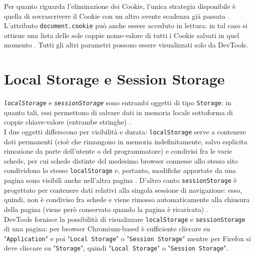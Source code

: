 \documentclass[a4paper, 12pt, twoside, openright]{book}
\begin{document}
Per quanto riguarda l'eliminazione dei Cookie, l'unica strategia disponibile è quella di sovrascrivere il Cookie con un altro avente scadenza già passata \cite{W3Schools:cookies}.\\
L'attributo \texttt{document.cookie} può anche essere acceduto in lettura: in tal caso si ottiene una lista delle sole coppie nome-valore di tutti i Cookie salvati in quel momento \cite{MDN_Web_docs:cookies}. Tutti gli altri parametri possono essere visualizzati solo da DevTools.

\section{Local Storage e Session Storage} %
\texttt{\textit{localStorage}} e \texttt{\textit{sessionStorage}} sono entrambi oggetti di tipo \texttt{Storage}: in quanto tali, essi permettono di salvare dati in memoria locale sottoforma di coppie chiave-valore (entrambe stringhe) \cite{MDN_Web_docs:storage_API}.\\
I due oggetti differscono per visibilità e durata: \texttt{localStorage} serve a contenere dati permanenti (cioè che rimangono in memoria indefinitamente, salvo esplicita rimozione da parte dell'utente o del programmatore) e condivisi fra le varie schede, per cui schede distinte del medesimo browser connesse allo stesso sito condividono lo stesso \texttt{localStorage} e, pertanto, modifiche apportate da una pagina sono visibili anche nell'altra pagina \cite{MDN_Web_docs:localStorage}. D'altro canto \texttt{sessionStorage} è progettato per contenere dati relativi alla singola sessione di navigazione: esso, quindi, non è condiviso fra schede e viene rimosso automaticamente alla chiusura della pagina (viene però conservato quando la pagina è ricaricata) \cite{MDN_Web_docs:sessionStorage}.\\
DevTools fornisce la possibilità di visualizzare \texttt{localStorage} e \texttt{sessionStorage} di una pagina: per browser Chromium-based è sufficiente cliccare su "\texttt{Application}" e poi "\texttt{Local Storage}" o "\texttt{Session Storage}" mentre per Firefox si deve cliccare su "\texttt{Storage}", quindi "\texttt{Local Storage}" o "\texttt{Session Storage}".
\end{document}
